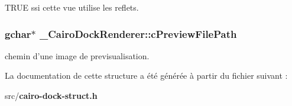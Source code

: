 TRUE ssi cette vue utilise les reflets. 

\subsubsection{\setlength{\rightskip}{0pt plus 5cm}gchar$\ast$ {\bf \_\-Cairo\-Dock\-Renderer::c\-Preview\-File\-Path}}\label{struct__CairoDockRenderer_ea4a7566977d2e3417374a7bad340b17}


chemin d'une image de previsualisation. 



La documentation de cette structure a \'{e}t\'{e} g\'{e}n\'{e}r\'{e}e \`{a} partir du fichier suivant :\begin{CompactItemize}
\item 
src/{\bf cairo-dock-struct.h}\end{CompactItemize}
